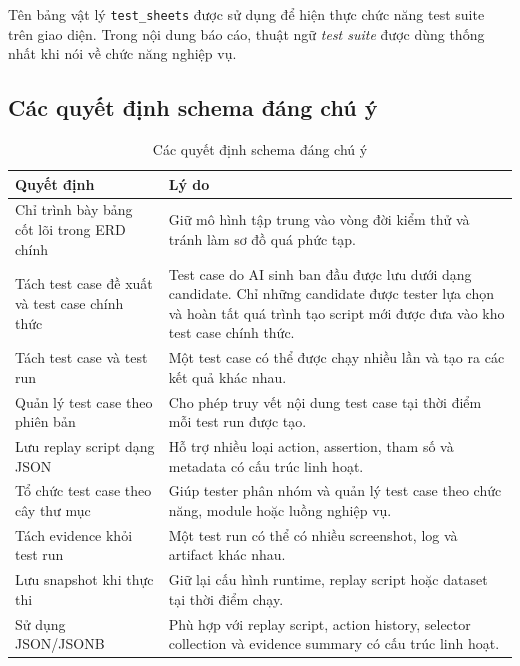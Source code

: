 Tên bảng vật lý \texttt{test\_sheets} được sử dụng để hiện thực chức năng test suite trên giao diện. Trong nội dung báo cáo, thuật ngữ \textit{test suite} được dùng thống nhất khi nói về chức năng nghiệp vụ.

\subsection{Các quyết định schema đáng chú ý}

\begin{table}[H]
\centering
\caption{Các quyết định schema đáng chú ý}
\label{tab:chapter4_schema_decisions}
\renewcommand{\arraystretch}{1.2}
\begin{tabular}{|p{4.2cm}|p{10.0cm}|}
\hline
\textbf{Quyết định} &
\textbf{Lý do} \\
\hline

Chỉ trình bày bảng cốt lõi trong ERD chính &
Giữ mô hình tập trung vào vòng đời kiểm thử và tránh làm sơ đồ quá phức tạp. \\
\hline

Tách test case đề xuất và test case chính thức &
Test case do AI sinh ban đầu được lưu dưới dạng candidate. Chỉ những candidate được tester lựa chọn và hoàn tất quá trình tạo script mới được đưa vào kho test case chính thức. \\
\hline

Tách test case và test run &
Một test case có thể được chạy nhiều lần và tạo ra các kết quả khác nhau. \\
\hline

Quản lý test case theo phiên bản &
Cho phép truy vết nội dung test case tại thời điểm mỗi test run được tạo. \\
\hline

Lưu replay script dạng JSON &
Hỗ trợ nhiều loại action, assertion, tham số và metadata có cấu trúc linh hoạt. \\
\hline

Tổ chức test case theo cây thư mục &
Giúp tester phân nhóm và quản lý test case theo chức năng, module hoặc luồng nghiệp vụ. \\
\hline

Tách evidence khỏi test run &
Một test run có thể có nhiều screenshot, log và artifact khác nhau. \\
\hline

Lưu snapshot khi thực thi &
Giữ lại cấu hình runtime, replay script hoặc dataset tại thời điểm chạy. \\
\hline

Sử dụng JSON/JSONB &
Phù hợp với replay script, action history, selector collection và evidence summary có cấu trúc linh hoạt. \\
\hline
\end{tabular}
\end{table}

